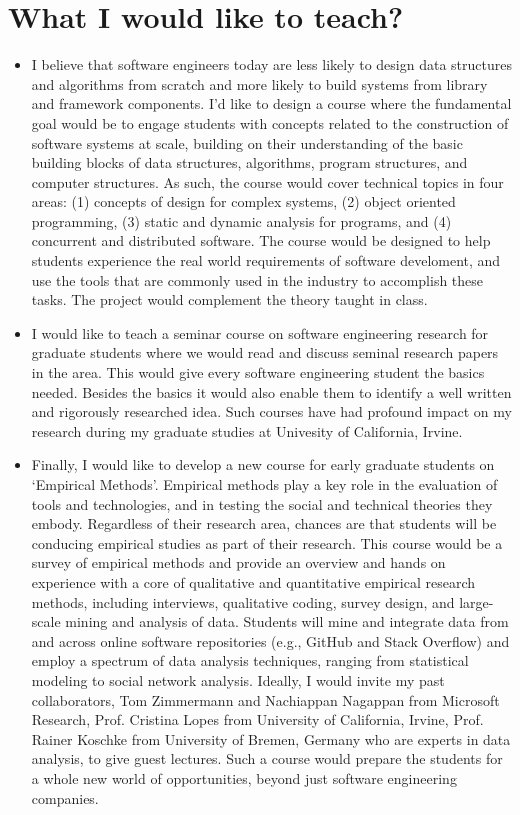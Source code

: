 \documentclass[a4paper]{article}
\begin{document}
\section*{What I would like to teach?}

\begin{itemize}

\item I believe that software engineers today are less likely to design data structures and algorithms from scratch and more likely to build systems from library and framework components.
I'd like to design a course where the fundamental goal would be to engage students with concepts related to the construction of software systems at scale, building on their understanding of the basic building blocks of data structures, algorithms, program structures, and computer structures. 
As such, the course would cover technical topics in four areas: (1) concepts of design for complex systems, (2) object oriented programming, (3) static and dynamic analysis for programs, and (4) concurrent and distributed software.
The course would be designed to help students experience the real world requirements of software develoment, and use the tools that are commonly used in the industry to accomplish these tasks. The project would complement the theory taught in class.

\item I would like to teach a seminar course on software engineering research for graduate students where we would read and discuss seminal research papers in the area. This would give every software engineering student the basics needed. Besides the basics it would also enable them to identify a well written and rigorously researched idea. Such courses have had profound impact on my research during my graduate studies at Univesity of California, Irvine.

\item Finally, I would like to develop a new course for early graduate students
on ‘Empirical Methods’. Empirical methods play a key role in the evaluation of tools and technologies, and in testing the social and technical theories they embody. Regardless of their research area, chances are that students will be conducing empirical studies as part of their research. This course would be a survey of empirical methods and provide an overview and hands on experience with a core of qualitative and quantitative empirical research methods, including interviews, qualitative coding, survey design, and large-scale mining and analysis of data. Students will mine and integrate data from and across online software repositories (e.g., GitHub and Stack Overflow) and employ a spectrum of data analysis techniques, ranging from statistical modeling to social network analysis.
Ideally, I would invite my past collaborators, Tom Zimmermann and Nachiappan Nagappan from Microsoft Research, Prof. Cristina Lopes from University of California, Irvine, Prof. Rainer Koschke from University of Bremen, Germany who are experts in data analysis, to give guest lectures. Such a course would prepare the students for a whole new world of opportunities, beyond just software engineering companies.
\end{itemize}
\end{document}
